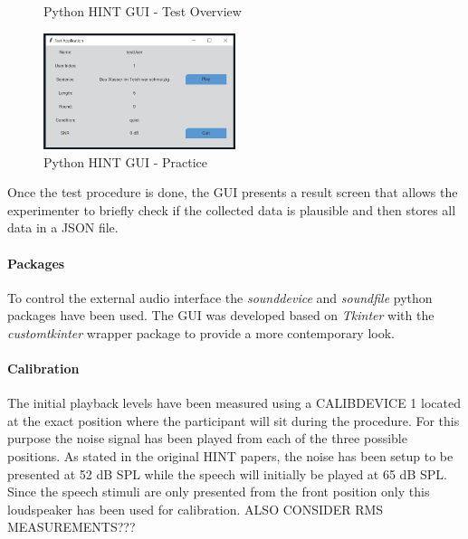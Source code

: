 \documentclass[a4paper,11pt]{article}%
\renewcommand{\\}{\vspace*{0.5\baselineskip} \newline}
\begin{document}
{{\begin{figure}[h!]
	\caption{Python HINT GUI - Test Overview}
	\label{fig:pyhint-overview}
\end{figure}
\newline
\begin{figure}[h!]
	\centering
	\includegraphics[width=0.5\textwidth]{PythonHINT-Practice.png}
	\caption{Python HINT GUI - Practice}
	\label{fig:pyhint-practice}
\end{figure}
\newline
Once the test procedure is done, the \ac{GUI} presents a result screen that allows the experimenter to briefly check if the collected data is plausible and then stores all data in a \ac{JSON} file.

\paragraph{Packages} To control the external audio interface the \textit{sounddevice} \cite{Sounddevice} and \textit{soundfile} python packages have been used. The \ac{GUI} was developed based on \textit{Tkinter} with the \textit{customtkinter} wrapper package to provide a more contemporary look.

\paragraph{Calibration} The initial playback levels have been measured using a CALIBDEVICE 1 located at the exact position where the participant will sit during the procedure. For this purpose the noise signal has been played from each of the three possible positions. As stated in the original \ac{HINT} papers, the noise has been setup to be presented at 52 dB \acs{SPL} while the speech will initially be played at 65 dB \ac{SPL}. Since the speech stimuli are only presented from the \dq front\dq{} position only this loudspeaker has been used for calibration.
\newline
\newline
ALSO CONSIDER RMS MEASUREMENTS???

}}
\end{document}
